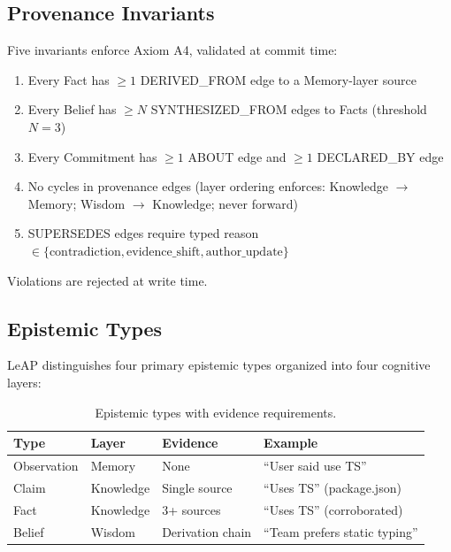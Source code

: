\documentclass[11pt,letterpaper]{article}
\begin{document}
\subsection{Provenance Invariants}

Five invariants enforce Axiom A4, validated at commit time:

\begin{enumerate}[noitemsep]
    \item[\textbf{I1}] Every Fact has $\geq 1$ DERIVED\_FROM edge to a Memory-layer source
    \item[\textbf{I2}] Every Belief has $\geq N$ SYNTHESIZED\_FROM edges to Facts (threshold $N = 3$)
    \item[\textbf{I3}] Every Commitment has $\geq 1$ ABOUT edge and $\geq 1$ DECLARED\_BY edge
    \item[\textbf{I4}] No cycles in provenance edges (layer ordering enforces: Knowledge $\to$ Memory; Wisdom $\to$ Knowledge; never forward)
    \item[\textbf{I5}] SUPERSEDES edges require typed reason $\in \{\text{contradiction}, \text{evidence\_shift}, \text{author\_update}\}$
\end{enumerate}

Violations are rejected at write time.

\subsection{Epistemic Types}

LeAP distinguishes four primary epistemic types organized into four cognitive layers:

\begin{table}[H]
\centering
\caption{Epistemic types with evidence requirements.}
\label{tab:types}
\begin{tabular}{@{}llll@{}}
\toprule
\textbf{Type} & \textbf{Layer} & \textbf{Evidence} & \textbf{Example} \\
\midrule
Observation & Memory & None & ``User said use TS'' \\
Claim & Knowledge & Single source & ``Uses TS'' (package.json) \\
Fact & Knowledge & 3+ sources & ``Uses TS'' (corroborated) \\
Belief & Wisdom & Derivation chain & ``Team prefers static typing'' \\
\bottomrule
\end{tabular}
\end{table}
\end{document}
